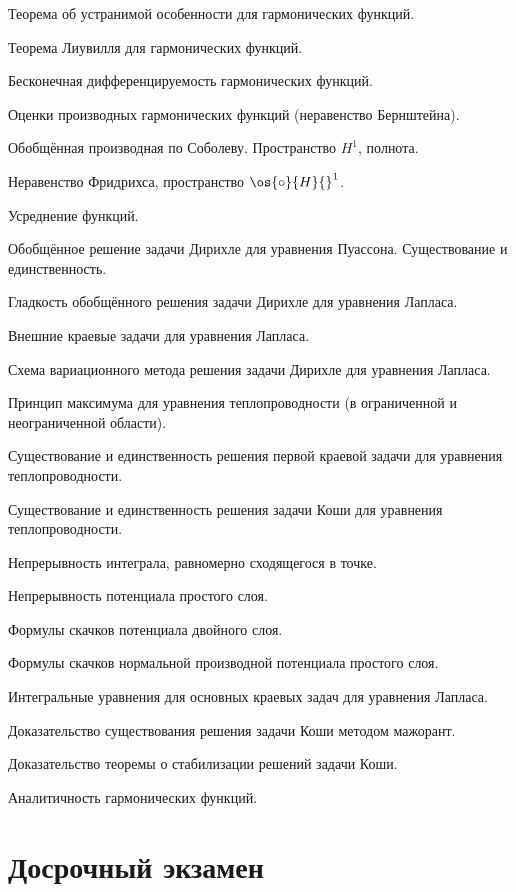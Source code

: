 \documentclass{article}
\begin{document}
\begin{nums}{-3}
\item Теорема об устранимой особенности для гармонических функций.
\item Теорема Лиувилля для гармонических функций.
\item Бесконечная дифференцируемость гармонических функций.
\item Оценки производных гармонических функций (неравенство Бернштейна).
\item Обобщённая производная по Соболеву. Пространство $H^1$, полнота.
\item Неравенство Фридрихса, пространство $\os{\circ}{H}{}^1$.
\item Усреднение функций.
\item Обобщённое решение задачи Дирихле для уравнения Пуассона.
Существование и единственность.
\item Гладкость обобщённого решения задачи Дирихле для уравнения
Лапласа.
\item Внешние краевые задачи для уравнения Лапласа.
\item Схема вариационного метода решения задачи Дирихле для
уравнения Лапласа.
\item Принцип максимума для уравнения теплопроводности (в ограниченной и неограниченной области).
\item Существование и единственность решения первой краевой задачи
для уравнения теплопроводности.
\item Существование и единственность решения задачи Коши для
уравнения теплопроводности.
\item Непрерывность интеграла, равномерно сходящегося в точке.
\item Непрерывность потенциала простого слоя.
\item Формулы скачков потенциала двойного слоя.
\item Формулы скачков нормальной производной потенциала простого
слоя.
\item Интегральные уравнения для основных краевых задач для
уравнения Лапласа.
\item Доказательство существования решения задачи Коши методом
мажорант.
\item Доказательство теоремы о стабилизации решений задачи Коши.
\item Аналитичность гармонических функций.
\end{nums}

\section{Досрочный экзамен}
\end{document}
